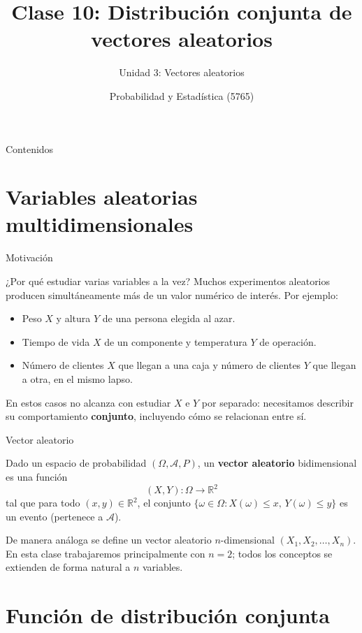 \documentclass[aspectratio=169,11pt]{beamer}
\title[Prob. y Estadística]{Clase 10: Distribución conjunta de vectores aleatorios}
\subtitle{Unidad 3: Vectores aleatorios}
\institute[UNS]{Universidad Nacional del Sur \\ Departamento de Matemática}
\author{Probabilidad y Estadística (5765)}
\date{}
\begin{document}
\begin{frame}
\titlepage
\end{frame}

\begin{frame}{Contenidos}
\tableofcontents
\end{frame}

\section{Variables aleatorias multidimensionales}

\begin{frame}{Motivación}
\begin{block}{¿Por qué estudiar varias variables a la vez?}
Muchos experimentos aleatorios producen simultáneamente más de un valor numérico de interés. Por ejemplo:
\begin{itemize}
\item Peso $X$ y altura $Y$ de una persona elegida al azar.
\item Tiempo de vida $X$ de un componente y temperatura $Y$ de operación.
\item Número de clientes $X$ que llegan a una caja y número de clientes $Y$ que llegan a otra, en el mismo lapso.
\end{itemize}
\end{block}
\pause
En estos casos no alcanza con estudiar $X$ e $Y$ por separado: necesitamos describir su comportamiento \textbf{conjunto}, incluyendo cómo se relacionan entre sí.
\end{frame}

\begin{frame}{Vector aleatorio}
\begin{definition}
Dado un espacio de probabilidad $(\Omega, \mathcal{A}, P)$, un \textbf{vector aleatorio} bidimensional es una función
\[
(X,Y): \Omega \longrightarrow \mathbb{R}^2
\]
tal que para todo $(x,y) \in \mathbb{R}^2$, el conjunto $\{\omega \in \Omega : X(\omega) \le x, \, Y(\omega) \le y\}$ es un evento (pertenece a $\mathcal{A}$).
\end{definition}
\pause
De manera análoga se define un vector aleatorio $n$-dimensional $(X_1, X_2, \ldots, X_n)$. En esta clase trabajaremos principalmente con $n=2$; todos los conceptos se extienden de forma natural a $n$ variables.
\end{frame}

\section{Función de distribución conjunta}
\end{document}
